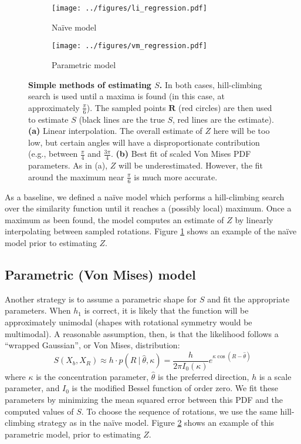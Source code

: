 \documentclass{article} %
\newcommand{\naive}[0]{na\"ive}
\newcommand{\Naive}[0]{Na\"ive}
\begin{document}
\begin{figure}[t]
  \centering
  \begin{subfigure}[b]{0.45\textwidth}
    \centering
    \texttt{[image: ../figures/li\_regression.pdf]}
    \caption{\Naive{} model}
    \label{fig:li}
  \end{subfigure}
  \begin{subfigure}[b]{0.45\textwidth}
    \centering
    \texttt{[image: ../figures/vm\_regression.pdf]}
    \caption{Parametric model}
    \label{fig:vm}
  \end{subfigure}
  \caption{\textbf{Simple methods of estimating $S$.} In both cases,
    hill-climbing search is used until a maxima is found (in this
    case, at approximately $\frac{\pi}{6}$). The sampled points
    $\mathbf{R}$ (red circles) are then used to estimate $S$ (black
    lines are the true $S$, red lines are the estimate). \textbf{(a)}
    Linear interpolation. The overall estimate of $Z$ here will be too
    low, but certain angles will have a disproportionate contribution
    (e.g., between $\frac{\pi}{4}$ and $\frac{3\pi}{4}$. \textbf{(b)}
    Best fit of scaled Von Mises PDF parameters. As in (a), $Z$ will
    be underestimated. However, the fit around the maximum near
    $\frac{\pi}{6}$ is much more accurate.}
  \label{fig:simple-models}
\end{figure}

As a baseline, we defined a \naive{} model which performs a
hill-climbing search over the similarity function until it reaches a
(possibly local) maximum. Once a maximum as been found, the model
computes an estimate of $Z$ by linearly interpolating between sampled
rotations. Figure \ref{fig:li} shows an example of the \naive{} model
prior to estimating $Z$.

\subsection{Parametric (Von Mises) model}

Another strategy is to assume a parametric shape for $S$ and fit the
appropriate parameters. When $h_1$ is correct, it is likely that the
function will be approximately unimodal (shapes with rotational
symmetry would be multimodal). A reasonable assumption, then, is that
the likelihood follows a ``wrapped Gaussian'', or Von Mises,
distribution:
\begin{equation}
  S(X_b, X_R) \approx h\cdot{}p(R\ \vert\ \hat{\theta}, \kappa)=\frac{h}{2\pi I_0(\kappa)}e^{\kappa\cos(R-\hat{\theta})}
\end{equation}
where $\kappa$ is the concentration parameter, $\hat{\theta}$ is the
preferred direction, $h$ is a scale parameter, and $I_0$ is the
modified Bessel function of order zero. We fit these parameters by
minimizing the mean squared error between this PDF and the computed
values of $S$. To choose the sequence of rotations, we use the same
hill-climbing strategy as in the \naive{} model. Figure \ref{fig:vm}
shows an example of this parametric model, prior to estimating $Z$.
\end{document}
